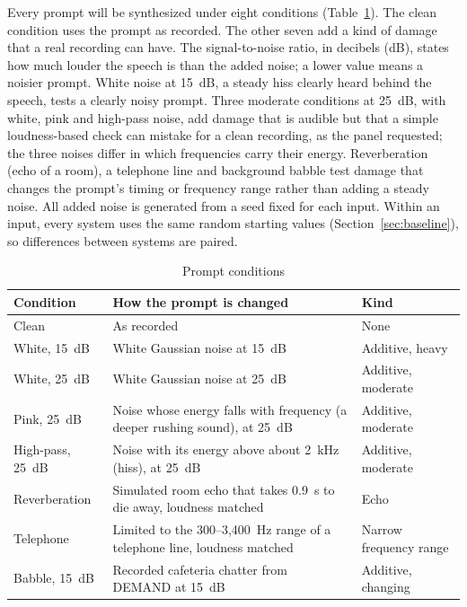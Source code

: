  Every prompt will be synthesized under eight conditions (Table~\ref{tab:conditions}). The clean condition uses the prompt as recorded. The other seven add a kind of damage that a real recording can have. The signal-to-noise ratio, in decibels (dB), states how much louder the speech is than the added noise; a lower value means a noisier prompt. White noise at 15~dB, a steady hiss clearly heard behind the speech, tests a clearly noisy prompt. Three moderate conditions at 25~dB, with white, pink and high-pass noise, add damage that is audible but that a simple loudness-based check can mistake for a clean recording, as the panel requested; the three noises differ in which frequencies carry their energy. Reverberation (echo of a room), a telephone line and background babble test damage that changes the prompt's timing or frequency range rather than adding a steady noise. All added noise is generated from a seed fixed for each input. Within an input, every system uses the same random starting values (Section~\ref{sec:baseline}), so differences between systems are paired.

\begin{table}[!htbp]
\centering\small
\caption{Prompt conditions}
\label{tab:conditions}
\begin{tabularx}{\textwidth}{@{}>{\raggedright\arraybackslash}p{2.6cm} >{\raggedright\arraybackslash}X >{\raggedright\arraybackslash}p{3.0cm}@{}}
\toprule
\textbf{Condition} & \textbf{How the prompt is changed} & \textbf{Kind} \\
\midrule
Clean & As recorded & None \\
White, 15~dB & White Gaussian noise at 15~dB & Additive, heavy \\
White, 25~dB & White Gaussian noise at 25~dB & Additive, moderate \\
Pink, 25~dB & Noise whose energy falls with frequency (a deeper rushing sound), at 25~dB & Additive, moderate \\
High-pass, 25~dB & Noise with its energy above about 2~kHz (hiss), at 25~dB & Additive, moderate \\
Reverberation & Simulated room echo that takes 0.9~s to die away, loudness matched & Echo \\
Telephone & Limited to the 300--3,400~Hz range of a telephone line, loudness matched & Narrow frequency range \\
Babble, 15~dB & Recorded cafeteria chatter from DEMAND \parencite{thiemann2013demand} at 15~dB & Additive, changing \\
\bottomrule
\end{tabularx}
\end{table}

